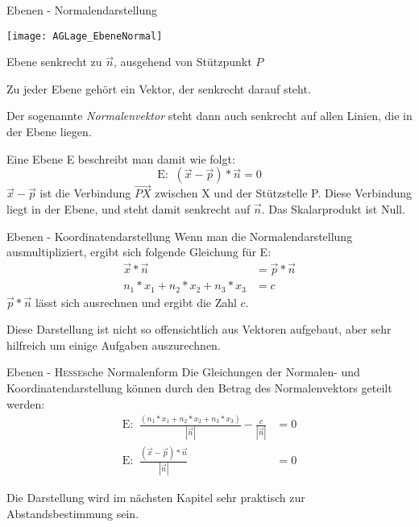 \begin{bla}{Ebenen - Normalendarstellung}
  \begin{marginfigure}[0em]
    \texttt{[image: AGLage\_EbeneNormal]}
    \caption{Ebene senkrecht zu $\vec{n}$, ausgehend von Stützpunkt $P$}
  \end{marginfigure}
  Zu jeder Ebene gehört ein Vektor, der senkrecht darauf steht.

  Der sogenannte \emph{Normalenvektor} steht dann auch senkrecht auf allen Linien, die in der Ebene liegen.

  Eine Ebene E beschreibt man damit wie folgt:
  \begin{equation*}
    \text{E: }\ \left( \vec{x} - \vec{p} \right) * \vec{n} = 0
  \end{equation*}
  $\vec{x} - \vec{p}$ ist die Verbindung $\overrightarrow{PX}$ zwischen X und der Stützstelle P.
  Diese Verbindung liegt in der Ebene, und steht damit senkrecht auf $\vec{n}$. Das Skalarprodukt ist Null.
\end{bla}



\begin{bla}{Ebenen - Koordinatendarstellung}
  \label{AG:E-Koordinatendarst}
  Wenn man die Normalendarstellung ausmultipliziert, ergibt sich folgende Gleichung für E:
  \begin{align*}
    \vec{x} * \vec{n} &= \vec{p} * \vec{n}\\
    n_1*x_1 + n_2*x_2 + n_3*x_3 &= c
  \end{align*}
  $\vec{p} * \vec{n}$ lässt sich ausrechnen und ergibt die Zahl $c$.

  Diese Darstellung ist nicht so offensichtlich aus Vektoren aufgebaut, aber sehr hilfreich um einige Aufgaben auszurechnen.
\end{bla}

\begin{bla}{Ebenen - \textsc{Hesse}sche Normalenform}
  Die Gleichungen der Normalen- und Koordinatendarstellung können durch den Betrag des Normalenvektors geteilt werden:
  \begin{align*}
    \text{E: }\ \frac{ \left(n_1*x_1 + n_2*x_2 + n_3*x_3\right)}{|\vec{n}|} - \frac{c}{|\vec{n}|}
    &=
    0
    \\
    \text{E: }\ \frac{\left( \vec{x} - \vec{p} \right) * \vec{n}}{|\vec{n}|}
    &=
    0
  \end{align*}

  Die Darstellung wird im nächsten Kapitel sehr praktisch zur Abstandsbestimmung sein.
\end{bla}

